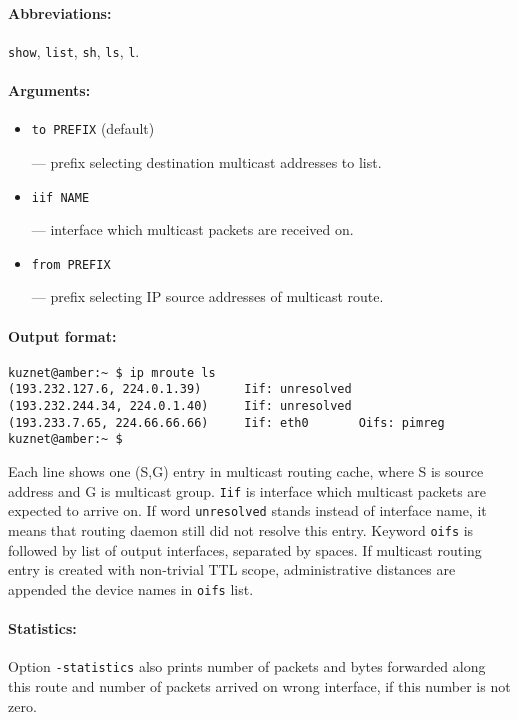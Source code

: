 \paragraph{Abbreviations:} \verb|show|, \verb|list|, \verb|sh|, \verb|ls|, \verb|l|.

\paragraph{Arguments:}

\begin{itemize}
\item \verb|to PREFIX| (default)

--- prefix selecting destination multicast addresses to list.


\item \verb|iif NAME|

--- interface which multicast packets are received on.


\item \verb|from PREFIX|

--- prefix selecting IP source addresses of multicast route.


\end{itemize}

\paragraph{Output format:}

\begin{verbatim}
kuznet@amber:~ $ ip mroute ls
(193.232.127.6, 224.0.1.39)      Iif: unresolved 
(193.232.244.34, 224.0.1.40)     Iif: unresolved 
(193.233.7.65, 224.66.66.66)     Iif: eth0       Oifs: pimreg 
kuznet@amber:~ $ 
\end{verbatim}

Each line shows one (S,G) entry in multicast routing cache,
where S is source address and G is multicast group. \verb|Iif| is
interface which multicast packets are expected to arrive on.
If word \verb|unresolved| stands instead of interface name,
it means that routing daemon still did not resolve this entry.
Keyword \verb|oifs| is followed by list of output interfaces, separated
by spaces. If multicast routing entry is created with non-trivial
TTL scope, administrative distances are appended the device names
in \verb|oifs| list.

\paragraph{Statistics:} Option \verb|-statistics| also prints
number of packets and bytes forwarded along this route and
number of packets arrived on wrong interface, if this number is not zero.

